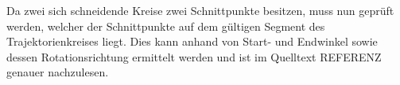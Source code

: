 Da zwei sich schneidende Kreise zwei Schnittpunkte besitzen, muss nun geprüft werden,  welcher der Schnittpunkte auf dem gültigen Segment des Trajektorienkreises liegt. Dies kann anhand von Start- und Endwinkel sowie dessen Rotationsrichtung ermittelt werden und ist im Quelltext REFERENZ genauer nachzulesen.

